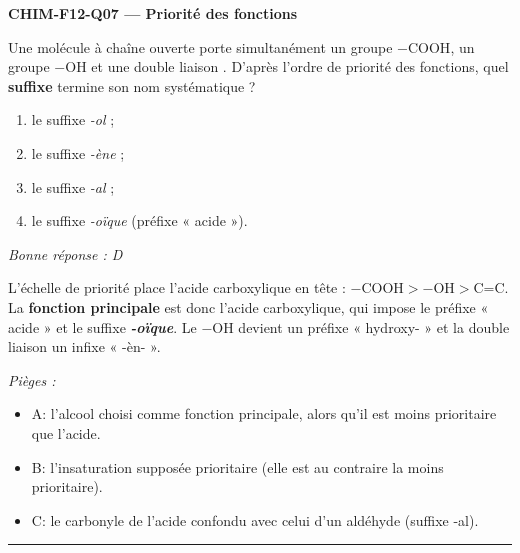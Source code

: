 \documentclass[11pt,a4paper]{article}
\begin{document}
\noindent\textbf{CHIM-F12-Q07 --- Priorité des fonctions}\par
Une molécule à chaîne ouverte porte simultanément un groupe $-\text{COOH}$, un groupe $-\text{OH}$ et une double liaison . D'après l'ordre de priorité des fonctions, quel \textbf{suffixe} termine son nom systématique ?
\begin{enumerate}[label=\Alph*)]
\item le suffixe \textit{-ol} ;
\item le suffixe \textit{-ène} ;
\item le suffixe \textit{-al} ;
\item le suffixe \textit{-oïque} (préfixe « acide »).
\end{enumerate}
\textit{Bonne réponse : D}\par
L'échelle de priorité place l'acide carboxylique en tête : $-\text{COOH} > -\text{OH} > \text{C=C}$. La \textbf{fonction principale} est donc l'acide carboxylique, qui impose le préfixe « acide » et le suffixe \textbf{\textit{-oïque}}. Le $-\text{OH}$ devient un préfixe « hydroxy- » et la double liaison un infixe « -èn- ».\par
\textit{Pièges :}
\begin{itemize}
\item A: l'alcool choisi comme fonction principale, alors qu'il est moins prioritaire que l'acide.
\item B: l'insaturation  supposée prioritaire (elle est au contraire la moins prioritaire).
\item C: le carbonyle de l'acide confondu avec celui d'un aldéhyde (suffixe -al).
\end{itemize}
\vspace{8pt}\hrule\vspace{8pt}
\end{document}
